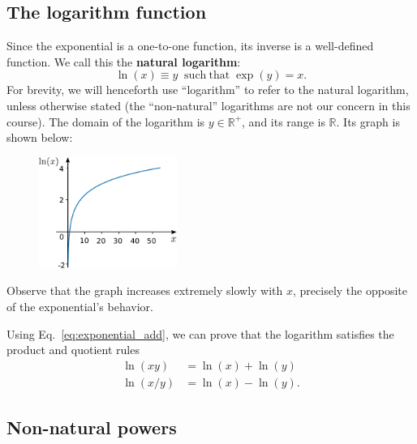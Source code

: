 \documentclass[10pt,a4paper]{article}
\begin{document}
\subsection{The logarithm function}
\label{the-logarithm-function}

Since the exponential is a one-to-one function, its inverse is a
well-defined function. We call this the \textbf{natural logarithm}:
\begin{equation}
  \ln(x) \equiv y \;\; \mathrm{such}~\mathrm{that}\; \exp(y) = x.
\end{equation}
For brevity, we will henceforth use ``logarithm'' to refer to the
natural logarithm, unless otherwise stated (the ``non-natural''
logarithms are not our concern in this course). The domain of the
logarithm is $y \in \mathbb{R}^+$, and its range is $\mathbb{R}$.  Its
graph is shown below:

\begin{figure}[ht]
  \centering\includegraphics[width=0.4\textwidth]{logarithm}
\end{figure}

\noindent
Observe that the graph increases extremely slowly with $x$, precisely
the opposite of the exponential's behavior.

Using Eq.~\eqref{eq:exponential_add}, we can prove that the logarithm
satisfies the product and quotient rules
\begin{align}
  \ln(xy) &= \ln(x) + \ln(y) \\
  \ln(x/y) &= \ln(x) - \ln(y).
\end{align}

\subsection{Non-natural powers}
\label{powers}
\end{document}
